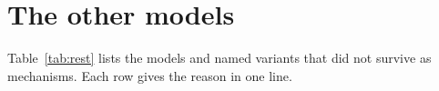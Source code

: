 \section{The other models}\label{sec:rest}

Table~\ref{tab:rest} lists the models and named variants that did not survive as mechanisms. Each row gives the reason in one line.



